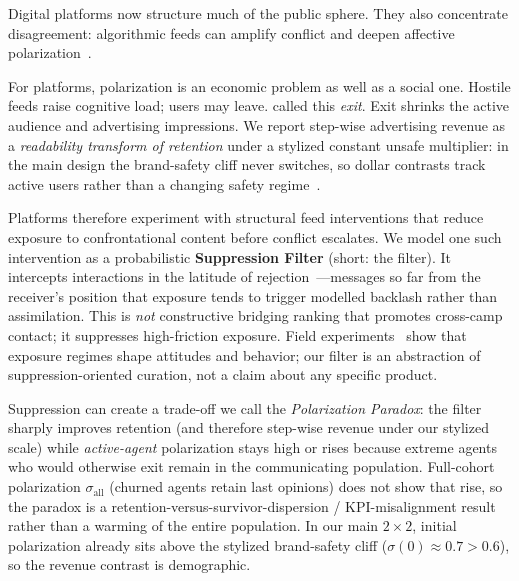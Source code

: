 Digital platforms now structure much of the public sphere. They also concentrate disagreement: algorithmic feeds can amplify conflict and deepen affective polarization~\citep{Bail2018, Levy2021}.

For platforms, polarization is an economic problem as well as a social one. Hostile feeds raise cognitive load; users may leave. \citet{Hirschman1970} called this \textit{exit}. Exit shrinks the active audience and advertising impressions. We report step-wise advertising revenue as a \emph{readability transform of retention} under a stylized constant unsafe multiplier: in the main design the brand-safety cliff never switches, so dollar contrasts track active users rather than a changing safety regime~\citep{Guess2023, Levy2021}.

Platforms therefore experiment with structural feed interventions that reduce exposure to confrontational content before conflict escalates. We model one such intervention as a probabilistic \textbf{Suppression Filter} (short: the filter). It intercepts interactions in the latitude of rejection~\citep{Sherif1961}---messages so far from the receiver's position that exposure tends to trigger modelled backlash rather than assimilation. This is \emph{not} constructive bridging ranking that promotes cross-camp contact; it suppresses high-friction exposure. Field experiments~\citep{Guess2023, Bail2018} show that exposure regimes shape attitudes and behavior; our filter is an abstraction of suppression-oriented curation, not a claim about any specific product.

Suppression can create a trade-off we call the \textit{Polarization Paradox}: the filter sharply improves retention (and therefore step-wise revenue under our stylized scale) while \emph{active-agent} polarization stays high or rises because extreme agents who would otherwise exit remain in the communicating population. Full-cohort polarization $\sigma_{\mathrm{all}}$ (churned agents retain last opinions) does not show that rise, so the paradox is a retention-versus-survivor-dispersion / KPI-misalignment result rather than a warming of the entire population. In our main $2\times2$, initial polarization already sits above the stylized brand-safety cliff ($\sigma(0)\approx0.7>0.6$), so the revenue contrast is demographic.

